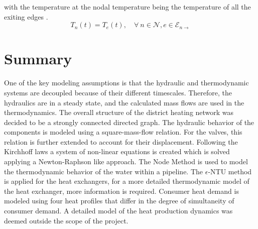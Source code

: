 with the temperature at the nodal temperature being the temperature of all the exiting edges \cite{Krug2020}. 
\begin{equation}
    T_n(t) = T_e(t), \quad \forall \ n \in \mathcal{N}, e \in \mathcal{E}_{n \rightarrow} 
\end{equation}

\section{Summary}
One of the key modeling assumptions is that the hydraulic and thermodynamic systems are decoupled because of their different timescales. Therefore, the hydraulics are in a steady state, and the calculated mass flows are used in the thermodynamics. The overall structure of the district heating network was decided to be a strongly connected directed graph. The hydraulic behavior of the components is modeled using a square-mass-flow relation. For the valves, this relation is further extended to account for their displacement. Following the Kirchhoff laws a system of non-linear equations is created which is solved applying a Newton-Raphson like approach. The Node Method is used to model the thermodynamic behavior of the water within a pipeline. The $\epsilon$-NTU method is applied for the heat exchangers, for a more detailed thermodynamic model of the heat exchanger, more information is required. Consumer heat demand is modeled using four heat profiles that differ in the degree of simultaneity of consumer demand. A detailed model of the heat production dynamics was deemed outside the scope of the project.  